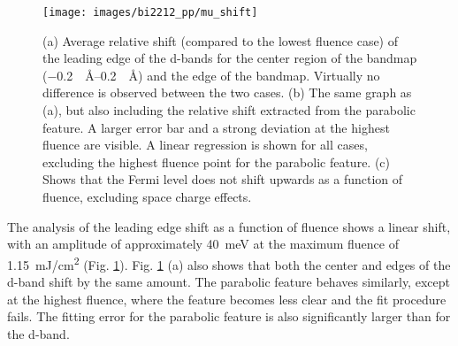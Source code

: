 \begin{figure}[b!]
	\centering
	\texttt{[image: images/bi2212\_pp/mu\_shift]}
	\caption{(a) Average relative shift (compared to the lowest fluence case) of the leading edge of the  d-bands for the center region of the bandmap (\qtyrange{-0.2}{0.2}{\per\angstrom}) and the edge of the bandmap. Virtually no difference is observed between the two cases. (b) The same graph as (a), but also including the relative shift extracted from the parabolic feature. A larger error bar and a strong deviation at the highest fluence are visible. A linear regression is shown for all cases, excluding the highest fluence point for the parabolic feature. (c) Shows that the Fermi level does not shift upwards as a function of fluence, excluding space charge effects.}
	\label{fig:mu_shift}
\end{figure}

The analysis of the leading edge shift as a function of fluence shows a linear shift, with an amplitude of approximately \qty{40}{\milli\electronvolt} at the maximum fluence of \qty{1.15}{\milli\joule/\centi\meter\squared} (Fig. \ref{fig:mu_shift}).
Fig. \ref{fig:mu_shift} (a) also shows that both the center and edges of the  d-band shift by the same amount.
The parabolic feature behaves similarly, except at the highest fluence, where the feature becomes less clear and the fit procedure fails.
The fitting error for the parabolic feature is also significantly larger than for the  d-band.

